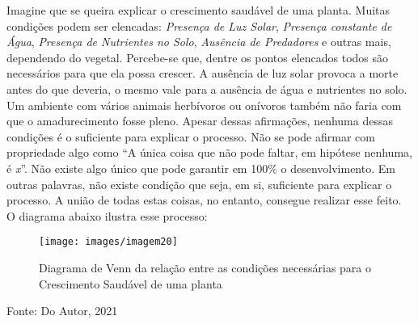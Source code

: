 \documentclass[
	12pt,				%
	oneside,			%
	a4paper,			%
	sumario=tradicional,
	english,			%
	brazil				%
	]{abntex2}
\newcommand{\bcenter}{\begin{center}}
\newcommand{\ecenter}{\end{center}}
\begin{document}
Imagine que se queira explicar o crescimento saudável de uma planta. Muitas condições podem ser elencadas: \emph{Presença de Luz Solar}, \emph{Presença constante de Água}, \emph{Presença de Nutrientes no Solo}, \emph{Ausência de Predadores} e outras mais, dependendo do vegetal. Percebe-se que, dentre os pontos elencados todos são necessários para que ela possa crescer. A ausência de luz solar provoca a morte antes do que deveria, o mesmo vale para a ausência de água e nutrientes no solo. Um ambiente com vários animais herbívoros ou onívoros também não faria com que o amadurecimento fosse pleno. Apesar dessas afirmações, nenhuma dessas condições é o suficiente para explicar o processo. Não se pode afirmar com propriedade algo como ``A única coisa que não pode faltar, em hipótese nenhuma, é \emph{x}''. Não existe algo único que pode garantir em 100\% o desenvolvimento. Em outras palavras, não existe condição que seja, em si, suficiente para explicar o processo. A união de todas estas coisas, no entanto, consegue realizar esse feito. O diagrama abaixo ilustra esse processo:
\begin{figure}[H]

{\centering \texttt{[image: images/imagem20]} 

}

\caption{Diagrama de Venn da relação entre as condições necessárias para o Crescimento Saudável de uma planta}\label{fig:imagem20}
\end{figure}
\bcenter

Fonte: Do Autor, 2021
\ecenter
\end{document}
